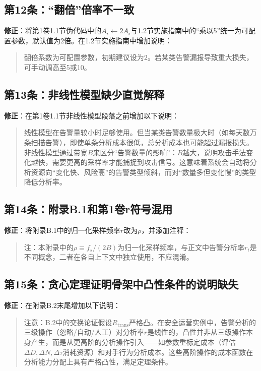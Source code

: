 \documentclass[11pt,a4paper]{article}
\begin{document}
\subsection{第12条：“翻倍”倍率不一致}

\textbf{修正}：将第1卷1.1节伪代码中的$A_i \gets 2A_i$与1.2节实施指南中的“乘以5”统一为可配置参数，默认值为2倍。在1.2节实施指南中增加说明：
\begin{quote}
翻倍系数为可配置参数，初期建议设为2。若某类告警漏报导致重大损失，可手动调高至5或10。
\end{quote}

\subsection{第13条：非线性模型缺少直觉解释}

\textbf{修正}：在第1卷1.1节非线性模型段落之前增加以下说明：
\begin{quote}
线性模型在告警量较小时足够使用。但当某类告警数量极大时（如每天数万条扫描告警），即使单条分析成本很低，总分析成本也可能超过漏报损失。非线性模型通过带宽$B$来区分“告警数量的影响”：$B$越大，说明攻击手法变化越快，需要更高的采样率才能捕捉到攻击信号。这意味着系统会自动将分析资源向“变化快、风险高”的告警类型倾斜，而对“数量多但变化慢”的类型降低分析率。
\end{quote}

\subsection{第14条：附录B.1和第1卷r符号混用}

\textbf{修正}：将附录B.1中的归一化采样频率$r$改为$\rho$，并添加注释：
\begin{quote}
注：本附录中的$\rho \equiv f_s/(2B)$为归一化采样频率，与正文中告警分析率$r_i$是不同概念，二者在各自上下文中独立使用，不应混淆。
\end{quote}

\subsection{第15条：贪心定理证明骨架中凸性条件的说明缺失}

\textbf{修正}：在附录B.2末尾增加以下说明：
\begin{quote}
注意：B.2中的交换论证假设$R_{\text{trans}}$严格凸。在安全运营实例中，告警分析的三级操作（忽略/自动/人工）对分析率$r$是线性的，凸性并非从三级操作本身产生，而是从更高阶的分析操作引入——如参数重标定成本（评估$\Delta D, \Delta N, \Delta \tau$消耗资源）和对手行为分析成本。这些高阶操作的成本函数在分析能力分配上具有严格凸性，满足定理条件。
\end{quote}
\end{document}
